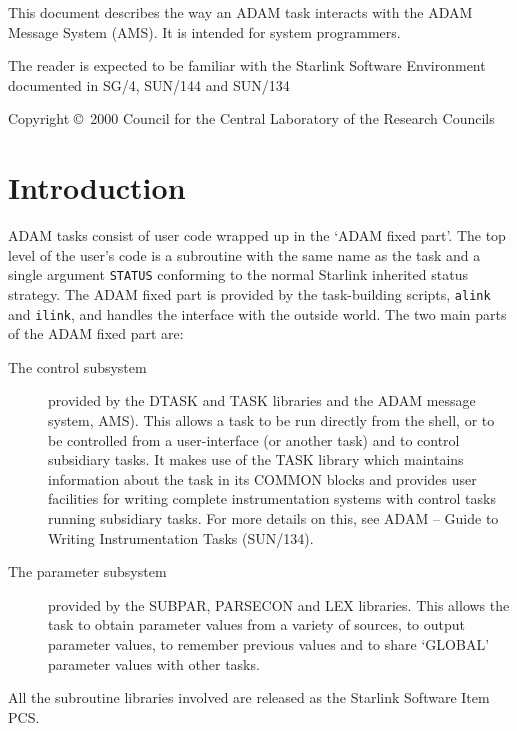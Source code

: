 \documentclass[twoside,11pt]{article}
\newcommand{\stardocinitials}  {SSN}
\newcommand{\stardoccopyright} 
{Copyright \copyright\ 2000 Council for the Central Laboratory of the Research Councils}
\newcommand{\stardocnumber}    {77.0}
\newcommand{\stardocabstract}  {This document describes the way an ADAM task
interacts with the ADAM Message System
(\xref{AMS}{sun241}{}).
It is intended for system programmers.

The reader is expected to be familiar with the Starlink Software Environment
documented in
\xref{SG/4}{sg4}{},
\xref{SUN/144}{sun144}{}
and
\xref{SUN/134}{sun134}{}}
\newcommand{\stardocname}{\stardocinitials /\stardocnumber}
\newenvironment{latexonly}{}{}
\newcommand{\latex}[1]{#1}
\newcommand{\xref}[3]{#1}
\renewcommand{\_}{\texttt{\symbol{95}}}
\renewcommand{\thepage}{\roman{page}}
\begin{document}
\stardocabstract

\begin{latexonly}
\newpage
\vspace*{\fill}
\stardoccopyright
\end{latexonly}

  \newpage
  \begin{latexonly}
    \setlength{\parskip}{0mm}
    \tableofcontents
    \setlength{\parskip}{\medskipamount}
    \markboth{\stardocname}{\stardocname}
  \end{latexonly}
\cleardoublepage
\renewcommand{\thepage}{\arabic{page}}
\setcounter{page}{1}

\section{Introduction}
ADAM tasks consist of user code wrapped up in the `ADAM fixed part'.
The top level of the user's code is a subroutine with the same name as the
task and a single argument \texttt{STATUS} conforming to 
\xref{the normal Starlink inherited status strategy}
{sun104}{inherited_status_checking}.
The ADAM fixed part is provided by the task-building scripts, 
\xref{\texttt{alink} and \texttt{ilink}}{sun144}{adam_link_scripts},
and handles the interface with the outside world. The two main parts of the
ADAM fixed part are:
\begin{description}
\item[The control subsystem]
provided by the DTASK and TASK libraries and the ADAM message system,
\xref{AMS}{sun241}{}).
This allows a task to be run directly from the shell, or to
be controlled from a user-interface (or another task) and to control
subsidiary tasks. It makes use of the TASK library which
maintains information about the task in its COMMON blocks and provides user
facilities for writing complete instrumentation systems with control tasks
running subsidiary tasks. For more details on this, see
\xref{ADAM -- Guide to Writing Instrumentation Tasks}{sun134}{}\latex{
(SUN/134)}.
\item[The parameter subsystem] provided by the SUBPAR, PARSECON and LEX
libraries. This allows the task to obtain parameter
values from a variety of sources, to output parameter values, to remember
previous values and to share `GLOBAL' parameter values with other tasks.
 \end{description}
All the subroutine libraries involved are released as the Starlink Software
Item
\xref{PCS}{ssn29}{}.
\end{document}
